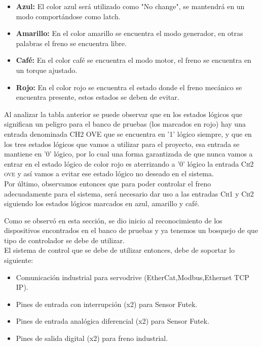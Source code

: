 \documentclass[12pt,titlepage]{article}
\begin{document}
\begin{itemize}
\item \textbf{Azul: } El color azul será utilizado como "No change", se mantendrá en un modo comportándose como latch. 
\item \textbf{Amarillo: } En el color amarillo se encuentra el modo generador, en otras palabras el freno se encuentra libre. 
\item \textbf{Café: } En el color café se encuentra el modo motor, el freno se encuentra en un torque ajustado. 
\item \textbf{Rojo: } En el color rojo se encuentra el estado donde el freno mecánico se encuentra presente, estos estados se deben de evitar. 
\end{itemize}

Al analizar la tabla anterior se puede observar que en los estados lógicos que significan un peligro para el banco de pruebas (los marcados en rojo) hay una entrada denominada \textsc{CH2 OVE} que se encuentra en '1' lógico siempre, y que en los tres estados lógicos que vamos a utilizar para el proyecto, esa entrada se mantiene en '0' lógico, por lo cual una forma garantizada de que nunca vamos a entrar en el estado lógico de color rojo es aterrizando a '0' lógico la entrada \textsc{Ch2 ove} y así vamos a evitar ese estado lógico no deseado en el sistema. \\ 

Por último, observamos entonces que para poder controlar el freno adecuadamente para el sistema, será necesario dar uso a las entradas \textsc{Ch1} y \textsc{Ch2} siguiendo los estados lógicos marcados en azul, amarillo y café.  

\newpage
Como se observó en esta sección, se dio inicio al reconocimiento de los dispositivos encontrados en el banco de pruebas y ya tenemos un bosquejo de que tipo de controlador se debe de utilizar.\\

El sistema de control que se debe de utilizar entonces, debe de soportar lo siguiente: 
\begin{itemize}
\item Comunicación industrial para servodrive (EtherCat,Modbus,Ethernet TCP IP).
\item Pines de entrada con interrupción (x2) para Sensor Futek.
\item Pines de entrada analógica diferencial (x2) para Sensor Futek.
\item Pines de salida digital (x2) para freno industrial.
\end{itemize} 
\end{document}
